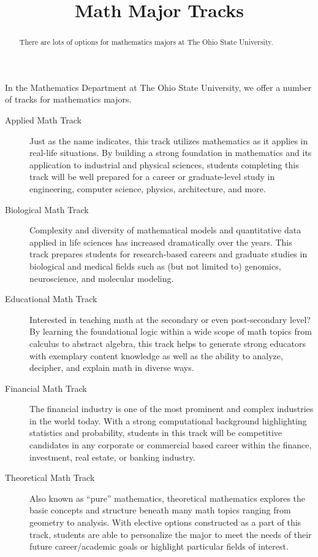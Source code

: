 \documentclass{ximera}
\title{Math Major Tracks}
\begin{document}
\begin{abstract}
There are lots of options for mathematics majors at The Ohio State University. 
\end{abstract}
\maketitle

In the Mathematics Department at The Ohio State University, we offer a
number of tracks for mathematics majors.

\begin{description}
\item[Applied Math Track] Just as the name indicates, this track
  utilizes mathematics as it applies in real-life situations.  By
  building a strong foundation in mathematics and its application to
  industrial and physical sciences, students completing this track
  will be well prepared for a career or graduate-level study in
  engineering, computer science, physics, architecture, and more.
 
\item[Biological Math Track] Complexity and diversity of mathematical
  models and quantitative data applied in life sciences has increased
  dramatically over the years.  This track prepares students for
  research-based careers and graduate studies in biological and
  medical fields such as (but not limited to) genomics, neuroscience,
  and molecular modeling.
 
\item[Educational Math Track] Interested in teaching math at the
  secondary or even post-secondary level?  By learning the
  foundational logic within a wide scope of math topics from calculus
  to abstract algebra, this track helps to generate strong educators
  with exemplary content knowledge as well as the ability to analyze,
  decipher, and explain math in diverse ways.
 
\item[Financial Math Track] The financial industry is one of the most
  prominent and complex industries in the world today.  With a strong
  computational background highlighting statistics and probability,
  students in this track will be competitive candidates in any
  corporate or commercial based career within the finance, investment,
  real estate, or banking industry.
 
\item[Theoretical Math Track] Also known as ``pure'' mathematics,
  theoretical mathematics explores the basic concepts and structure
  beneath many math topics ranging from geometry to analysis.  With
  elective options constructed as a part of this track, students are
  able to personalize the major to meet the needs of their future
  career/academic goals or highlight particular fields of interest.
\end{description}
\end{document}

